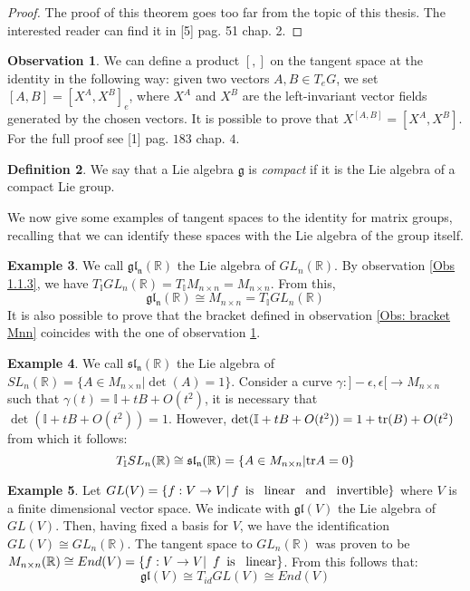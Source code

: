 \documentclass[12pt,a4paper]{report}
\theoremstyle{definition}
\newtheorem{Def}{Definition}[chapter]
\theoremstyle{Theorem}
\theoremstyle{definition}
\newtheorem{Ex}[Def]{Example}
\theoremstyle{definition}
\newtheorem{Obs}[Def]{Observation}
\begin{document}
	\begin{proof}
		The proof of this theorem goes too far from the topic of this thesis. The interested reader can find it in [5] pag. 51 chap. 2.
	\end{proof}
	\begin{Obs}\label{Obs: bracket T}
		We can define a product $[,]$ on the tangent space at the identity in the following way: given two vectors $A,B\in T_eG$, we set $[A,B]=[X^A,X^B]_e$, where $X^A$ and $X^B$ are the left-invariant vector fields generated by the chosen vectors. It is possible to prove that $X^{[A,B]}=[X^A,X^B]$. 
		For the full proof see [1] pag. $183$ chap. $4$.
	\end{Obs}
	\begin{Def}
		We say that a Lie algebra $\mathfrak{g}$ is \textit{compact} if it is the Lie algebra of a compact Lie group.
	\end{Def}
	We now give some examples of tangent spaces to the identity for matrix groups, recalling that we can identify these spaces with the Lie algebra of the group itself.
	\begin{Ex}
		We call $\mathfrak{gl_n(\mathbb{R})}$ the Lie algebra of $GL_n(\mathbb{R})$.
		By observation \ref{Obs 1.1.3}, we have $T_\mathbb{I}GL_n(\mathbb{R})=T_\mathbb{I}M_{n\times n}=M_{n\times n}$. From this, $$\mathfrak{gl_n(\mathbb{R})}\cong M_{n\times n}= T_\mathbb{I}GL_n(\mathbb{R})$$
		It is also possible to prove that the bracket defined in observation \ref{Obs: bracket Mnn} coincides with the one of observation \ref{Obs: bracket T}.
	\end{Ex}
	\begin{Ex}
		We call $\mathfrak{sl_n(\mathbb{R})}$ the Lie algebra of $SL_n(\mathbb{R})=\{A\in M_{n\times n}|\det(A)=1\}$.
		Consider a curve $\gamma:]-\epsilon,\epsilon[\rightarrow M_{n\times n}$ such that $\gamma(t)=\mathbb{I}+tB+O(t^2)$, it is necessary that $\det(\mathbb{I}+tB+O(t^2))=1$. However, $\det(\mathbb{I}+tB+O(t^2))=1+\hbox{tr}(B)+O(t^2)$ from which it follows: $$T_\mathbb{I}SL_n(\mathbb{R})\cong \mathfrak{sl_n(\mathbb{R})}=\{A\in M_{n\times n}|\hbox{tr}A=0\}$$ 
	\end{Ex}
	\begin{Ex}
		Let $GL(V)=\{f:V\rightarrow V|\, \textnormal{$f$\,  is \, linear \, and \, invertible}\}$ where $V$ is a finite dimensional vector space. We indicate with $\mathfrak{gl}(V)$ the Lie algebra of $GL(V)$.  Then, having fixed a basis for $V$, we have the identification $GL(V)\cong GL_n(\mathbb{R})$. The tangent space to $GL_n(\mathbb{R})$ was proven to be $M_{n\times n}(\mathbb{R})\cong End(V)=\{f:V\rightarrow V|\textnormal{\, $f$\, is \, linear}\}$. From this follows that: 
		$$\mathfrak{gl}(V)\cong T_{id}GL(V)\cong End(V)$$ 
	\end{Ex}
\end{document}

